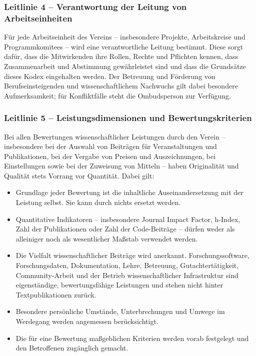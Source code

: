 \documentclass[a4paper, fontsize=11pt]{scrartcl}
\begin{document}
\subsubsection*{Leitlinie 4 -- Verantwortung der Leitung von Arbeitseinheiten}
Für jede Arbeitseinheit des Vereins -- insbesondere Projekte, Arbeitskreise und Programmkomitees -- wird eine verantwortliche Leitung bestimmt. Diese sorgt dafür, dass die Mitwirkenden ihre Rollen, Rechte und Pflichten kennen, dass Zusammenarbeit und Abstimmung gewährleistet sind und dass die Grundsätze dieses Kodex eingehalten werden. Der Betreuung und Förderung von Berufseinsteigenden und wissenschaftlichem Nachwuchs gilt dabei besondere Aufmerksamkeit; für Konfliktfälle steht die Ombudsperson zur Verfügung.

\subsubsection*{Leitlinie 5 -- Leistungsdimensionen und Bewertungskriterien}
Bei allen Bewertungen wissenschaftlicher Leistungen durch den Verein -- insbesondere bei der Auswahl von Beiträgen für Veranstaltungen und Publikationen, bei der Vergabe von Preisen und Auszeichnungen, bei Einstellungen sowie bei der Zuweisung von Mitteln -- haben Originalität und Qualität stets Vorrang vor Quantität. Dabei gilt:
\begin{itemize}
  \item Grundlage jeder Bewertung ist die inhaltliche Auseinandersetzung mit der Leistung selbst. Sie kann durch nichts ersetzt werden.
  \item Quantitative Indikatoren -- insbesondere Journal Impact Factor, h-Index, Zahl der Publikationen oder Zahl der Code-Beiträge -- dürfen weder als alleiniger noch als wesentlicher Maßstab verwendet werden.
  \item Die Vielfalt wissenschaftlicher Beiträge wird anerkannt. Forschungssoftware, Forschungsdaten, Dokumentation, Lehre, Betreuung, Gutachtertätigkeit, Community-Arbeit und der Betrieb wissenschaftlicher Infrastruktur sind eigenständige, bewertungsfähige Leistungen und stehen nicht hinter Textpublikationen zurück.
  \item Besondere persönliche Umstände, Unterbrechungen und Umwege im Werdegang werden angemessen berücksichtigt.
  \item Die für eine Bewertung maßgeblichen Kriterien werden vorab festgelegt und den Betroffenen zugänglich gemacht.
\end{itemize}
\end{document}
